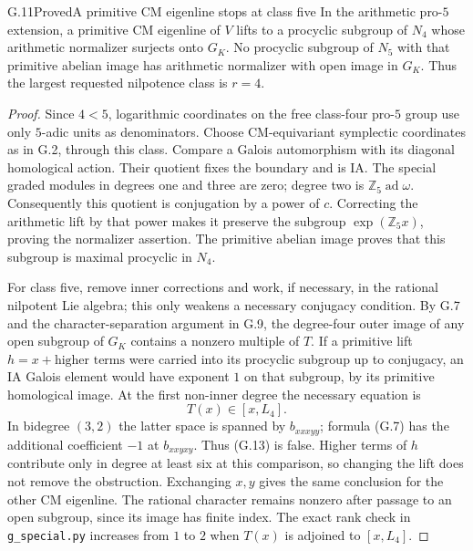 \begin{statement}{G.11}{Proved}{A primitive CM eigenline stops at class five}
In the arithmetic pro-$5$ extension, a primitive CM eigenline of
$V$ lifts to a procyclic subgroup of $N_4$ whose arithmetic normalizer
surjects onto $G_K$. No procyclic subgroup of $N_5$ with that primitive
abelian image has arithmetic normalizer with open image in $G_K$.
Thus the largest requested nilpotence class is $r=4$.
\end{statement}
\begin{proof}
Since $4<5$, logarithmic coordinates on the free class-four pro-$5$
group use only $5$-adic units as denominators. Choose CM-equivariant
symplectic coordinates as in G.2, through this class. Compare a Galois
automorphism with its diagonal homological action. Their quotient
fixes the boundary and is IA. The special graded modules in degrees
one and three are zero; degree two is $\mathbb Z_5\operatorname{ad}
\omega$. Consequently this quotient is conjugation by a power of
$c$. Correcting the arithmetic lift by that power makes it preserve
the subgroup $\exp(\mathbb Z_5x)$, proving the normalizer assertion.
The primitive abelian image proves that this subgroup is maximal
procyclic in $N_4$.

For class five, remove inner corrections and work, if necessary,
in the rational nilpotent Lie algebra; this only weakens a necessary
conjugacy condition. By G.7 and the character-separation argument in
G.9, the degree-four outer image of any open subgroup of
$G_K$ contains a nonzero multiple of $T$. If a primitive lift
$h=x+\text{higher terms}$ were carried into its procyclic subgroup
up to conjugacy, an IA Galois element would have exponent $1$ on
that subgroup, by its primitive homological image. At the first
non-inner degree the necessary equation is
\[
                  T(x)\in[x,L_4].                       \tag{G.13}
\]
In bidegree $(3,2)$ the latter space is spanned by $b_{xxxyy}$;
formula (G.7) has the additional coefficient $-1$ at $b_{xxyxy}$.
Thus (G.13) is false. Higher terms of $h$ contribute only in degree
at least six at this comparison, so changing the lift does not
remove the obstruction. Exchanging $x,y$ gives the same conclusion
for the other CM eigenline. The rational character remains nonzero
after passage to an open subgroup, since its image has finite index.
The exact rank check in \texttt{g\_special.py} increases from $1$ to
$2$ when $T(x)$ is adjoined to $[x,L_4]$.
\end{proof}

